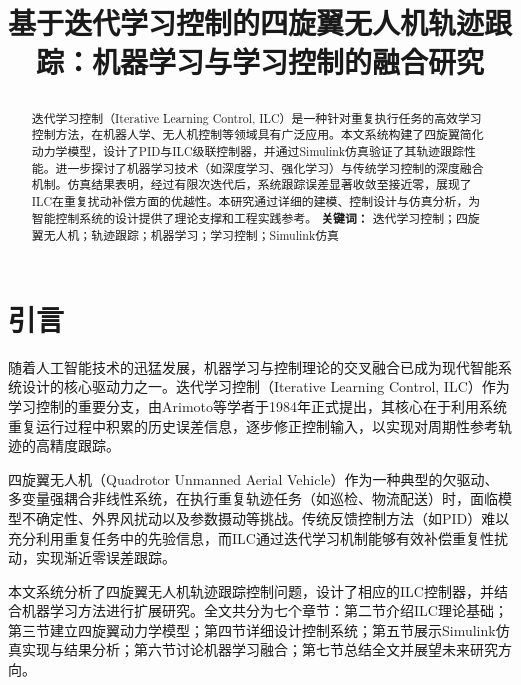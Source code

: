 \documentclass[12pt,hyperref,a4paper,UTF8]{ctexart}
\title{
		\vspace{1cm}
		\songti \xiaoerhao \textbf{基于迭代学习控制的四旋翼无人机轨迹跟踪：机器学习与学习控制的融合研究} \par
		\vspace{1cm}
		\songti \sihao {\textbf{曾康慧}} \par
		\vspace{13cm}
	}
\begin{document}
	
	\cover
	\thispagestyle{empty}
	
	\newpage
	\begin{abstract}
		
		迭代学习控制（Iterative Learning Control, ILC）是一种针对重复执行任务的高效学习控制方法，在机器人学、无人机控制等领域具有广泛应用。本文系统构建了四旋翼简化动力学模型，设计了PID与ILC级联控制器，并通过Simulink仿真验证了其轨迹跟踪性能。进一步探讨了机器学习技术（如深度学习、强化学习）与传统学习控制的深度融合机制。仿真结果表明，经过有限次迭代后，系统跟踪误差显著收敛至接近零，展现了ILC在重复扰动补偿方面的优越性。本研究通过详细的建模、控制设计与仿真分析，为智能控制系统的设计提供了理论支撑和工程实践参考。
		\textbf{关键词：} 迭代学习控制；四旋翼无人机；轨迹跟踪；机器学习；学习控制；Simulink仿真
	\end{abstract}
	
	\thispagestyle{empty}
	
	\newpage
	\tableofcontents
	\thispagestyle{empty}
	
	\newpage
	\setcounter{page}{1}
	
	
	\section{引言}
	随着人工智能技术的迅猛发展，机器学习与控制理论的交叉融合已成为现代智能系统设计的核心驱动力之一。迭代学习控制（Iterative Learning Control, ILC）作为学习控制的重要分支，由Arimoto等学者于1984年正式提出\cite{ahn2007}，其核心在于利用系统重复运行过程中积累的历史误差信息，逐步修正控制输入，以实现对周期性参考轨迹的高精度跟踪\cite{ilc_review2024}。
	
	四旋翼无人机（Quadrotor Unmanned Aerial Vehicle）作为一种典型的欠驱动、多变量强耦合非线性系统，在执行重复轨迹任务（如巡检、物流配送）时，面临模型不确定性、外界风扰动以及参数摄动等挑战\cite{foudeh2020, nek2025, nguyen2021}。传统反馈控制方法（如PID）难以充分利用重复任务中的先验信息，而ILC通过迭代学习机制能够有效补偿重复性扰动，实现渐近零误差跟踪\cite{schoellig2012, wei2025, bhounsule202x}。
	
	本文系统分析了四旋翼无人机轨迹跟踪控制问题，设计了相应的ILC控制器，并结合机器学习方法进行扩展研究\cite{deepilc2021, xu2020, tao2025, liu2025, meindl2022}。全文共分为七个章节：第二节介绍ILC理论基础；第三节建立四旋翼动力学模型；第四节详细设计控制系统；第五节展示Simulink仿真实现与结果分析；第六节讨论机器学习融合；第七节总结全文并展望未来研究方向。
	
\end{document}
